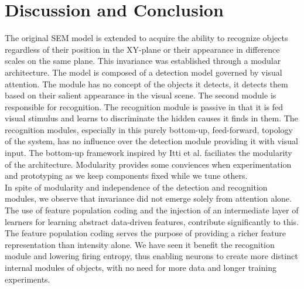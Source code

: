 \documentclass{report}
\begin{document}
\chapter{Discussion and Conclusion}

The original SEM model is extended to acquire the ability to recognize objects regardless of their position in the XY-plane or their appearance in difference scales on the same plane. This invariance was established through a modular architecture. The model is composed of a detection model governed by visual attention. The module has no concept of the objects it detects, it detects them based on their salient appearance in the visual scene. The second module is responsible for recognition. The recognition module is passive in that it is fed visual stimulus and learns to discriminate the hidden causes it finds in them. The recognition modules, especially in this purely bottom-up, feed-forward, topology of the system, has no influence over the detection module providing it with visual input. The bottom-up framework inspired by Itti et al. faciliates the modularity of the architecture. Modularity provides some conviences when experimentation and prototyping as we keep components fixed while we tune others.\\
In spite of modularity and independence of the detection and recognition modules, we observe that invariance did not emerge solely from attention alone. The use of feature population coding and the injection of an intermediate layer of learners for learning abstract data-driven features, contribute significantly to this. The feature population coding serves the purpose of providing a richer feature representation than intensity alone. We have seen it benefit the recognition module and lowering firing entropy, thus enabling neurons to create more distinct internal modules of objects, with no need for more data and longer training experiments.
\end{document}
